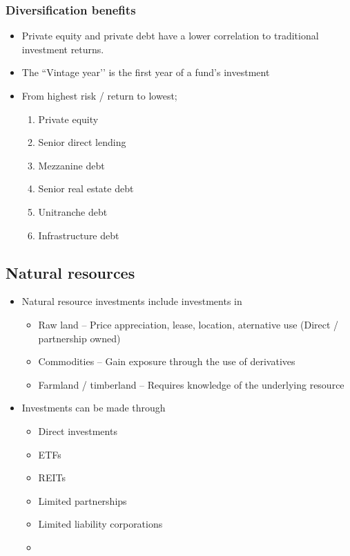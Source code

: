 \documentclass[../notes_compiled.tex]{subfiles}
\begin{document}
\subsubsection{Diversification benefits}
\begin{itemize}
\item Private equity and private debt have a lower correlation to traditional investment returns.
\item The ``Vintage year’’ is the first year of a fund’s investment
\item From highest risk / return to lowest;
\begin{multicols}{3}
\begin{enumerate}
\item[1.] Private equity
\item[4.] Senior direct lending
\item[2.] Mezzanine debt
\item[5.] Senior real estate debt
\item[3.] Unitranche debt
\item[6.] Infrastructure debt
\end{enumerate}
\end{multicols}
\end{itemize}

\subsection{Natural resources}
\begin{itemize}
\item Natural resource investments include investments in
\begin{itemize}
\item Raw land -- Price appreciation, lease, location, aternative use (Direct / partnership owned)
\item Commodities -- Gain exposure through the use of derivatives
\item Farmland / timberland -- Requires knowledge of the underlying resource
\end{itemize}
\item Investments can be made through
\begin{multicols}{2}
\begin{itemize}
\item Direct investments
\item ETFs
\item REITs
\item Limited partnerships
\item Limited liability corporations
\item[]
\end{itemize}
\end{multicols}
\end{itemize}
\end{document}
